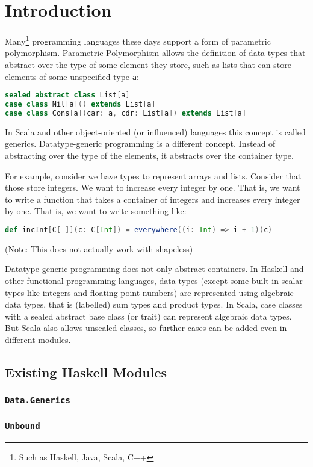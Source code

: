 \chapter{Introduction}

Many\footnote{Such as Haskell, Java, Scala, C++} programming languages these days support a form of parametric polymorphism.
Parametric Polymorphism allows the definition of data types that abstract over
the type of some element they store, such as lists that can store elements of
some unspecified type \lstinline{a}:
\begin{lstlisting}[language=scala]
sealed abstract class List[a]
case class Nil[a]() extends List[a]
case class Cons[a](car: a, cdr: List[a]) extends List[a]
\end{lstlisting}
In Scala and other object-oriented (or influenced) languages this concept is
called generics.
Datatype-generic programming is a different concept. Instead of abstracting
over the type of the elements, it abstracts over the container type.

For example, consider we have types to represent arrays and lists. Consider that
those store integers. We want to increase every integer by one. That is, we want
to write a function that takes a container of integers and increases every integer
by one. That is, we want to write something like:

\begin{lstlisting}[language=Scala]
def incInt[C[_]](c: C[Int]) = everywhere((i: Int) => i + 1)(c)
\end{lstlisting}
(Note: This does not actually work with shapeless)

Datatype-generic programming does not only abstract containers. In Haskell and
other functional programming languages, data types (except some built-in scalar
types like integers and floating point numbers) are represented using
algebraic data types, that is (labelled) sum types and product types.
In Scala, case classes with a sealed abstract base class (or trait) can
represent algebraic data types.\cite{scalagp}
But Scala also allows unsealed classes, so further cases can be added even in
different modules.


\section{Existing Haskell Modules}
\subsection{\texttt{Data.Generics}}
\subsection{\texttt{Unbound}}

\cite{DBLP:conf/tldi/LammelJ03}
